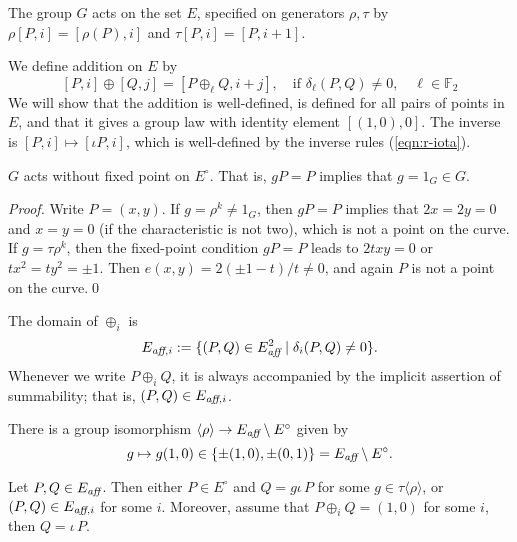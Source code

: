 \documentclass{llncs}
\newcommand{\ring}[1]{\mathbb{#1}}
\newcommand{\op}[1]{\hbox{#1}}
\newcommand{\Eaff}{E_{\op{\scriptsize\it aff}}}
\newcommand{\Eaf}[1]{E_{\op{\scriptsize\it aff},{#1}}}
\newcommand{\Eoo}{E^{\circ}} %
\newcommand{\ang}[1]{\langle{#1}\rangle}
\begin{document}
The group $G$ acts on the set $E$, specified on generators $\rho,\tau$
by $\rho[P,i]=[\rho(P),i]$ and $\tau[P,i]=[P,i+1]$.

We define addition on $E$ by
\begin{equation}\label{eqn:add-proj}
[P,i]\oplus [Q,j] = [P\oplus_\ell Q,i+j],\quad 
\text{if } \delta_\ell(P,Q)\ne 0,\quad \ell\in\ring{F}_2
\end{equation}
We will show that the addition is well-defined, is defined for all
pairs of points in $E$, and that it gives a group law with identity
element $[(1,0),0]$.  The inverse is $[P,i]\mapsto [\iota P,i]$, which
is well-defined by the inverse rules (\ref{eqn:r-iota}).


\begin{lemma} \label{lemma:no-fix} $G$ acts without fixed point on
  $\Eoo$.  That is, $g P = P$ implies that $g=1_G\in G$.
\end{lemma}

\begin{proof} Write $P=(x,y)$.  If $g = \rho^k\ne 1_G$, then $g P = P$
  implies that $2x=2y=0$ and $x=y=0$ (if the characteristic is not
  two), which is not a point on the curve.  If $g = \tau \rho^k$, then
  the fixed-point condition $g P = P$ leads to $2t x y=0$ or $t x^2 =
  t y^2 =\pm 1$.  Then $e(x,y) = 2 (\pm1-t)/t\ne0$, and again $P$ is
  not a point on the curve.\qed
\end{proof}

The domain of $\oplus_i$ is
\[
\Eaf{i} := \{(P,Q)\in \Eaff^2\mid \delta_i(P,Q)\ne0\}.
\]
Whenever we write $P\oplus_i Q$, it is always accompanied by the
implicit assertion of summability; that is, $(P,Q)\in \Eaf{i}$.

There is a group isomorphism $\ang{\rho}\to \Eaff\setminus\Eoo$ given by
\[
g\mapsto g(1,0)\in\{\pm (1,0),\pm (0,1)\} = \Eaff\setminus \Eoo.
\]

\begin{lemma}[dichotomy]\label{lemma:noco} 
Let $P,Q\in \Eaff$.  Then either $P\in \Eoo$ and $Q=g \iota\, P$ for
some $g\in \tau\ang{\rho}$, or $(P,Q)\in \Eaf{i}$ for some $i$.
Moreover, assume that $P\oplus_i Q = (1,0)$ for some $i$, then $Q =
\iota\,P$.
\end{lemma}
\end{document}
